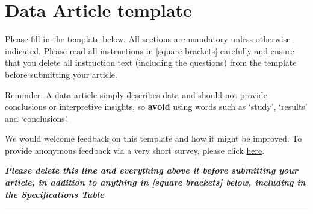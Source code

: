 \documentclass[times,final]{elsarticle}
\begin{document}
\clearpage
\hypertarget{target2}{}
\section*{Data Article template}
\noindent
Please fill in the template below. All sections are mandatory unless
otherwise indicated. Please read all instructions in [square brackets]
carefully and ensure that you delete all instruction text (including
the questions) from the template before submitting your article.

\vskip6pt\noindent
Reminder: A data article simply describes data and should not provide
conclusions or interpretive insights, so \textbf{avoid} using words such as
`study', `results' and `conclusions'.

\vskip6pt\noindent
We would welcome feedback on this template and how it might be
improved. To provide anonymous feedback via a very short survey, please
click \href{https://forms.office.com/Pages/ResponsePage.aspx?id=P-50kiWUCUGif5-xXBBnXTeXkbO343VFrbpYVBvxdZtUM05UVjIwM0U4WlRKUldCOTNMRUQwOVRHTy4u}%
{here}.

\vskip6pt\noindent
{\small\textbf{\textit{Please delete this line and everything above it before submitting your
article, in addition to anything in [square brackets] below, including
in the Specifications Table}}\vskip6pt\hrule\vskip12pt}
\end{document}
